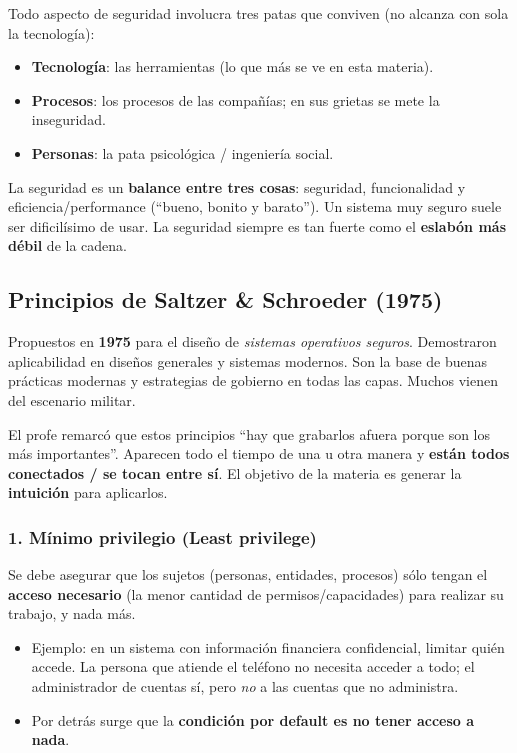 \documentclass[../main.tex]{subfiles}
\begin{document}
Todo aspecto de seguridad involucra tres patas que conviven (no alcanza con sola la tecnología):
\begin{itemize}
  \item \textbf{Tecnología}: las herramientas (lo que más se ve en esta materia).
  \item \textbf{Procesos}: los procesos de las compañías; en sus grietas se mete la inseguridad.
  \item \textbf{Personas}: la pata psicológica / ingeniería social. 
\end{itemize}

\begin{destacado}
La seguridad es un \textbf{balance entre tres cosas}: seguridad, funcionalidad y eficiencia/performance (``bueno, bonito y barato''). Un sistema muy seguro suele ser dificilísimo de usar. La seguridad siempre es tan fuerte como el \textbf{eslabón más débil} de la cadena.
\end{destacado}

\subsection{Principios de Saltzer \& Schroeder (1975)}

Propuestos en \textbf{1975} para el diseño de \emph{sistemas operativos seguros}. Demostraron aplicabilidad en diseños generales y sistemas modernos. Son la base de buenas prácticas modernas y estrategias de gobierno en todas las capas. Muchos vienen del escenario militar.

\begin{destacado}
El profe remarcó que estos principios ``hay que grabarlos afuera porque son los más importantes''. Aparecen todo el tiempo de una u otra manera y \textbf{están todos conectados / se tocan entre sí}. El objetivo de la materia es generar la \textbf{intuición} para aplicarlos.
\end{destacado}

\subsubsection{1. Mínimo privilegio (Least privilege)}
Se debe asegurar que los sujetos (personas, entidades, procesos) sólo tengan el \textbf{acceso necesario} (la menor cantidad de permisos/capacidades) para realizar su trabajo, y nada más.
\begin{itemize}
  \item Ejemplo: en un sistema con información financiera confidencial, limitar quién accede. La persona que atiende el teléfono no necesita acceder a todo; el administrador de cuentas sí, pero \emph{no} a las cuentas que no administra.
  \item Por detrás surge que la \textbf{condición por default es no tener acceso a nada}.
\end{itemize}
\end{document}
